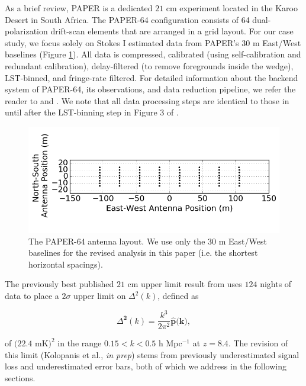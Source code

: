 \documentclass[preprint2,numberedappendix,tighten]{aastex6}  %
\begin{document}
As a brief review, PAPER is a dedicated $21$ cm experiment located in the Karoo Desert in South Africa. The PAPER-64 
configuration consists of 64 dual-polarization drift-scan elements that are arranged in a grid layout. For our case study, we 
focus solely on Stokes I estimated data \citep{moore_et_al2013} from PAPER's $30$ m East/West baselines (Figure 
\ref{fig:ant_layout}). All data is compressed, calibrated (using self-calibration and redundant calibration), delay-filtered (to remove foregrounds inside the wedge), LST-binned, and fringe-rate filtered. For detailed information about the backend system of PAPER-64, its observations, and data reduction pipeline, we 
refer the reader to \citet{parsons_et_al2010} and . We note that all data processing steps are identical to those in  until after the LST-binning step in Figure 3 of .

\begin{figure}
	\centering
	\includegraphics[trim={0cm 0cm 0cm 0cm},width=\columnwidth]{plots/ant_layout_aspect.png}
	\caption{The PAPER-64 antenna layout. We use only the $30$ m East/West baselines for the revised analysis in this 
paper (i.e. the shortest horizontal spacings).}
	\label{fig:ant_layout}
\end{figure}

The previously best published $21$ cm upper limit result from  uses $124$ nights of data to place a $2\sigma$ upper limit 
on $\Delta^{2}(k)$, defined as

\begin{equation}
\Delta^{\textbf{2}}(k) = \frac{k^{3}}{2\pi^{2}}\widehat{\textbf{p}}\textbf{(k)},
\end{equation}

\noindent of $(22.4$ mK$)^{2}$ in the range $0.15 < k < 0.5$ h Mpc$^{-1}$ at $z = 8.4$. The revision of this limit (Kolopanis et al., \textit{in prep}) stems from previously underestimated signal loss and underestimated error bars, both of which we 
address in the following sections. 
\end{document}
